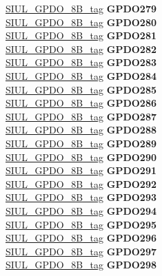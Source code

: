 \begin{DoxyCompactItemize}
\begin{tabbing}
\>\>\mbox{\hyperlink{unionSIUL__GPDO__8B__tag}{SIUL\_GPDO\_8B\_tag}} {\bfseries GPDO279}\\
\>\>\mbox{\hyperlink{unionSIUL__GPDO__8B__tag}{SIUL\_GPDO\_8B\_tag}} {\bfseries GPDO280}\\
\>\>\mbox{\hyperlink{unionSIUL__GPDO__8B__tag}{SIUL\_GPDO\_8B\_tag}} {\bfseries GPDO281}\\
\>\>\mbox{\hyperlink{unionSIUL__GPDO__8B__tag}{SIUL\_GPDO\_8B\_tag}} {\bfseries GPDO282}\\
\>\>\mbox{\hyperlink{unionSIUL__GPDO__8B__tag}{SIUL\_GPDO\_8B\_tag}} {\bfseries GPDO283}\\
\>\>\mbox{\hyperlink{unionSIUL__GPDO__8B__tag}{SIUL\_GPDO\_8B\_tag}} {\bfseries GPDO284}\\
\>\>\mbox{\hyperlink{unionSIUL__GPDO__8B__tag}{SIUL\_GPDO\_8B\_tag}} {\bfseries GPDO285}\\
\>\>\mbox{\hyperlink{unionSIUL__GPDO__8B__tag}{SIUL\_GPDO\_8B\_tag}} {\bfseries GPDO286}\\
\>\>\mbox{\hyperlink{unionSIUL__GPDO__8B__tag}{SIUL\_GPDO\_8B\_tag}} {\bfseries GPDO287}\\
\>\>\mbox{\hyperlink{unionSIUL__GPDO__8B__tag}{SIUL\_GPDO\_8B\_tag}} {\bfseries GPDO288}\\
\>\>\mbox{\hyperlink{unionSIUL__GPDO__8B__tag}{SIUL\_GPDO\_8B\_tag}} {\bfseries GPDO289}\\
\>\>\mbox{\hyperlink{unionSIUL__GPDO__8B__tag}{SIUL\_GPDO\_8B\_tag}} {\bfseries GPDO290}\\
\>\>\mbox{\hyperlink{unionSIUL__GPDO__8B__tag}{SIUL\_GPDO\_8B\_tag}} {\bfseries GPDO291}\\
\>\>\mbox{\hyperlink{unionSIUL__GPDO__8B__tag}{SIUL\_GPDO\_8B\_tag}} {\bfseries GPDO292}\\
\>\>\mbox{\hyperlink{unionSIUL__GPDO__8B__tag}{SIUL\_GPDO\_8B\_tag}} {\bfseries GPDO293}\\
\>\>\mbox{\hyperlink{unionSIUL__GPDO__8B__tag}{SIUL\_GPDO\_8B\_tag}} {\bfseries GPDO294}\\
\>\>\mbox{\hyperlink{unionSIUL__GPDO__8B__tag}{SIUL\_GPDO\_8B\_tag}} {\bfseries GPDO295}\\
\>\>\mbox{\hyperlink{unionSIUL__GPDO__8B__tag}{SIUL\_GPDO\_8B\_tag}} {\bfseries GPDO296}\\
\>\>\mbox{\hyperlink{unionSIUL__GPDO__8B__tag}{SIUL\_GPDO\_8B\_tag}} {\bfseries GPDO297}\\
\>\>\mbox{\hyperlink{unionSIUL__GPDO__8B__tag}{SIUL\_GPDO\_8B\_tag}} {\bfseries GPDO298}\\

\end{tabbing}
\end{DoxyCompactItemize}
